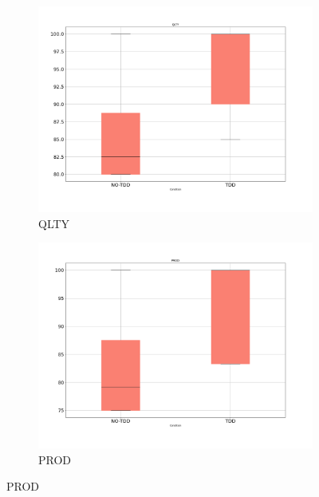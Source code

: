 \begin{figure}[H]
    \centering
    \begin{subfigure}{0.5\textwidth}
        \includegraphics[width=\linewidth]{figures/box_plots/task3/QLTY.png}
        \caption{QLTY}
        \label{bp_task3_qlty}
    \end{subfigure}\hfil
    \begin{subfigure}{0.5\textwidth}
        \includegraphics[width=\linewidth]{figures/box_plots/task3/PROD.png}
        \caption{PROD}
        \label{bp_task3_prod}
    \end{subfigure}

    \medskip


\end{figure}
